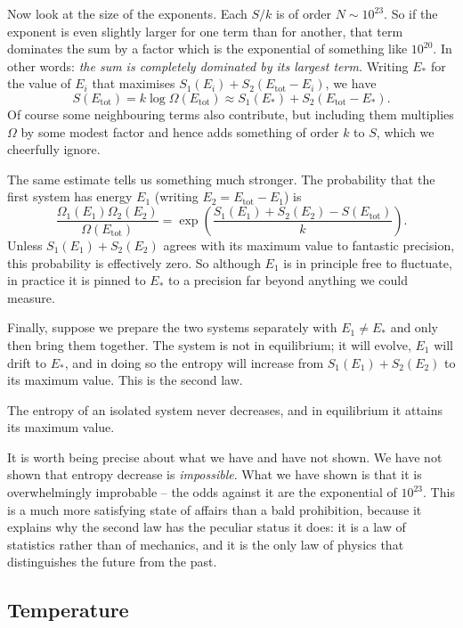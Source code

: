 Now look at the size of the exponents. Each $S/k$ is of order $N \sim 10^{23}$. So if the exponent is even slightly larger for one term than for another, that term dominates the sum by a factor which is the exponential of something like $10^{20}$. In other words: \emph{the sum is completely dominated by its largest term.} Writing $E_*$ for the value of $E_i$ that maximises $S_1(E_i) + S_2(E_{\mathrm{tot}} - E_i)$, we have
$$
S(E_{\mathrm{tot}}) = k\log \Omega(E_{\mathrm{tot}}) \approx S_1(E_*) + S_2(E_{\mathrm{tot}} - E_*).
$$
Of course some neighbouring terms also contribute, but including them multiplies $\Omega$ by some modest factor and hence adds something of order $k$ to $S$, which we cheerfully ignore.

The same estimate tells us something much stronger. The probability that the first system has energy $E_1$ (writing $E_2 = E_{\mathrm{tot}} - E_1$) is
$$
\frac{\Omega_1(E_1)\Omega_2(E_2)}{\Omega(E_{\mathrm{tot}})} = \exp\left( \frac{S_1(E_1) + S_2(E_2) - S(E_{\mathrm{tot}})}{k} \right).
$$
Unless $S_1(E_1) + S_2(E_2)$ agrees with its maximum value to fantastic precision, this probability is effectively zero. So although $E_1$ is in principle free to fluctuate, in practice it is pinned to $E_*$ to a precision far beyond anything we could measure.

Finally, suppose we prepare the two systems separately with $E_1 \neq E_*$ and only then bring them together. The system is not in equilibrium; it will evolve, $E_1$ will drift to $E_*$, and in doing so the entropy will increase from $S_1(E_1) + S_2(E_2)$ to its maximum value. This is the second law.

\begin{law}
	The entropy of an isolated system never decreases, and in equilibrium it attains its maximum value.
\end{law}

It is worth being precise about what we have and have not shown. We have not shown that entropy decrease is \emph{impossible}. What we have shown is that it is overwhelmingly improbable -- the odds against it are the exponential of $10^{23}$. This is a much more satisfying state of affairs than a bald prohibition, because it explains why the second law has the peculiar status it does: it is a law of statistics rather than of mechanics, and it is the only law of physics that distinguishes the future from the past.

\subsection{Temperature}

